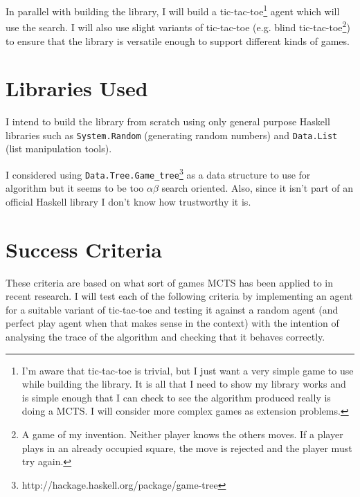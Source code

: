 \documentclass[12pt]{article}
\begin{document}
In parallel with building the library, I will build a tic-tac-toe\footnote{I'm aware that tic-tac-toe is trivial, but I just want a very simple game to use while building the library. It is all that I need to show my library works and is simple enough that I can check to see the algorithm produced really is doing a MCTS. I will consider more complex games as extension problems.} agent which will use the search. I will also use slight variants of tic-tac-toe (e.g. blind tic-tac-toe\footnote{A game of my invention. Neither player knows the others moves. If a player plays in an already occupied square, the move is rejected and the player must try again.}) to ensure that the library is versatile enough to support different kinds of games.


\section*{Libraries Used}
I intend to build the library from scratch using only general purpose Haskell libraries such as \verb+System.Random+ (generating random numbers) and \verb+Data.List+ (list manipulation tools).

I considered using \verb+Data.Tree.Game_tree+\footnote{http://hackage.haskell.org/package/game-tree} as a data structure to use for algorithm but it seems to be too $\alpha\beta$ search oriented. Also, since it isn't part of an official Haskell library I don't know how trustworthy it is.


\section*{Success Criteria}

These criteria are based on what sort of games MCTS has been applied to in recent research. I will test each of the following criteria by implementing an agent for a suitable variant of tic-tac-toe and testing it against a random agent (and perfect play agent when that makes sense in the context) with the intention of analysing the trace of the algorithm and checking that it behaves correctly.
\end{document}
